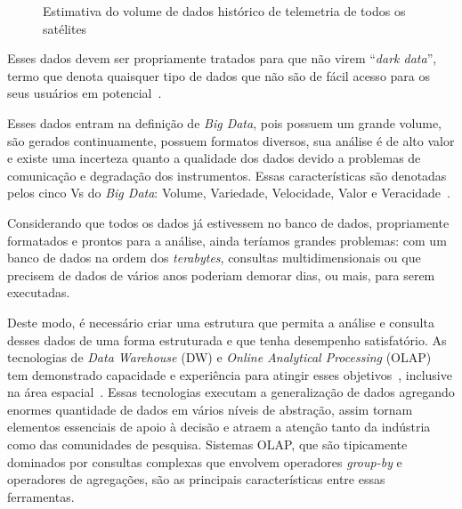 {\begin{figure}[!hb]
	\caption{Estimativa do volume de dados histórico de telemetria de todos os satélites}\label{fig:totaldatagen}
	\vspace{4mm}
	\begin{center}
	\end{center}
	\vspace{2mm}
\end{figure}

Esses dados devem ser propriamente tratados para que não virem ``\textit{dark data}'', termo que denota quaisquer tipo de dados que não são de fácil acesso para os seus usuários em potencial~\cite{heidornSheddingLightDark2008}.

Esses dados entram na definição de \textit{Big Data}, pois possuem um grande volume, são gerados continuamente, possuem formatos diversos, sua análise é de alto valor e existe uma incerteza quanto a qualidade dos dados devido a problemas de comunicação e degradação dos instrumentos.
Essas características são denotadas pelos cinco Vs do \textit{Big Data}: Volume, Variedade, Velocidade, Valor e Veracidade~\cite{kacfahemaniUnderstandableBigData2015}.

Considerando que todos os dados já estivessem no banco de dados, propriamente formatados e prontos para a análise, ainda teríamos grandes problemas: com um banco de dados na ordem dos \textit{terabytes}, consultas multidimensionais ou que precisem de dados de vários anos poderiam demorar dias, ou mais, para serem executadas.

}

Deste modo, é necessário criar uma estrutura que permita a análise e consulta desses dados de uma forma estruturada e que tenha desempenho satisfatório.
As tecnologias de \textit{Data Warehouse} (DW) e \textit{Online Analytical Processing} (OLAP) tem demonstrado capacidade e experiência para atingir esses objetivos~\cite{bimonteOpenIssuesBig2016}, inclusive na área espacial~\cite{yvernesCopernicusGroundSegment2018}.
Essas tecnologias executam a generalização de dados agregando enormes quantidade de dados em vários níveis de abstração, assim tornam elementos essenciais de apoio à decisão e atraem a atenção tanto da indústria como das comunidades de pesquisa.
Sistemas OLAP, que são tipicamente dominados por consultas complexas que envolvem operadores \textit{group-by} e operadores de agregações, são as principais características entre essas ferramentas.

